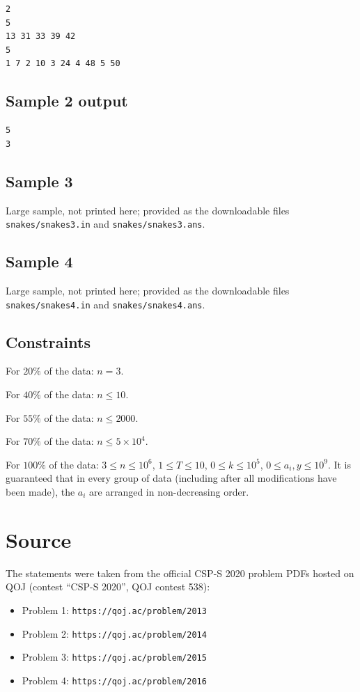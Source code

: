 \documentclass[11pt]{article}
\begin{document}
\begin{verbatim}
2
5
13 31 33 39 42
5
1 7 2 10 3 24 4 48 5 50
\end{verbatim}

\subsection*{Sample 2 output}

\begin{verbatim}
5
3
\end{verbatim}

\subsection*{Sample 3}

Large sample, not printed here;
provided as the downloadable files \texttt{snakes/snakes3.in} and \texttt{snakes/snakes3.ans}.

\subsection*{Sample 4}

Large sample, not printed here;
provided as the downloadable files \texttt{snakes/snakes4.in} and \texttt{snakes/snakes4.ans}.

\subsection*{Constraints}

For $20\%$ of the data: $n = 3$.

For $40\%$ of the data: $n \le 10$.

For $55\%$ of the data: $n \le 2000$.

For $70\%$ of the data: $n \le 5 \times 10^4$.

For $100\%$ of the data: $3 \le n \le 10^6$, $1 \le T \le 10$,
$0 \le k \le 10^5$, $0 \le a_i, y \le 10^9$.
It is guaranteed that in every group of data (including after all
modifications have been made), the $a_i$ are arranged in non-decreasing
order.

\section*{Source}

The statements were taken from the official CSP-S 2020 problem PDFs hosted on
QOJ (contest ``CSP-S 2020'', QOJ contest 538):
\begin{itemize}
\item Problem 1: \texttt{https://qoj.ac/problem/2013}
\item Problem 2: \texttt{https://qoj.ac/problem/2014}
\item Problem 3: \texttt{https://qoj.ac/problem/2015}
\item Problem 4: \texttt{https://qoj.ac/problem/2016}
\end{itemize}
\end{document}
